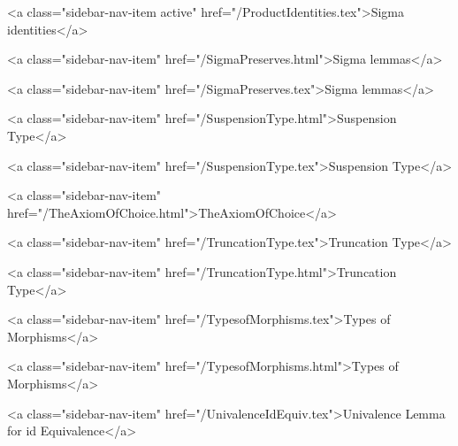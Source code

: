       
    
      
        
          <a class="sidebar-nav-item active" href="/ProductIdentities.tex">Sigma identities</a>
        
      
    
      
        
          <a class="sidebar-nav-item" href="/SigmaPreserves.html">Sigma lemmas</a>
        
      
    
      
        
          <a class="sidebar-nav-item" href="/SigmaPreserves.tex">Sigma lemmas</a>
        
      
    
      
        
          <a class="sidebar-nav-item" href="/SuspensionType.html">Suspension Type</a>
        
      
    
      
        
          <a class="sidebar-nav-item" href="/SuspensionType.tex">Suspension Type</a>
        
      
    
      
        
          <a class="sidebar-nav-item" href="/TheAxiomOfChoice.html">TheAxiomOfChoice</a>
        
      
    
      
        
          <a class="sidebar-nav-item" href="/TruncationType.tex">Truncation Type</a>
        
      
    
      
        
          <a class="sidebar-nav-item" href="/TruncationType.html">Truncation Type</a>
        
      
    
      
        
          <a class="sidebar-nav-item" href="/TypesofMorphisms.tex">Types of Morphisms</a>
        
      
    
      
        
          <a class="sidebar-nav-item" href="/TypesofMorphisms.html">Types of Morphisms</a>
        
      
    
      
        
          <a class="sidebar-nav-item" href="/UnivalenceIdEquiv.tex">Univalence Lemma for id Equivalence</a>
        
